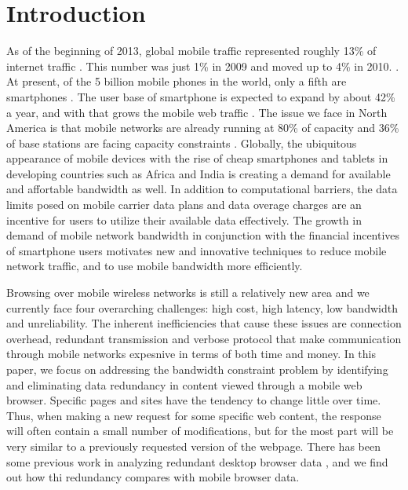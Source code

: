 \section{Introduction}
As of the beginning of 2013, global mobile traffic represented roughly 13\% of internet traffic \cite{?}. This number was just 1\% in 2009 and moved up 
to 4\% in 2010. \cite{?}. At present, of the 5 billion mobile phones in the world, only a fifth are 
smartphones \cite{?}. The user base of smartphone is expected to expand by about 42\% a year, and with that grows the mobile web traffic \cite{?}. The 
issue we face in North America is that mobile networks are already running at 80\% of capacity and 36\% of base stations are facing capacity constraints \cite{?}. Globally, the ubiquitous appearance of mobile devices with the rise of cheap smartphones and 
tablets in developing countries such as Africa and India is creating a demand for available and affortable bandwidth as well. In addition to computational 
barriers, the data limits posed on mobile carrier data plans and data overage charges are an incentive for users to utilize their available data effectively.  The growth in demand of mobile network bandwidth in conjunction with the financial incentives of smartphone users motivates new and innovative techniques 
to reduce mobile network traffic, and to use mobile bandwidth more efficiently. 

Browsing over mobile wireless networks is still a relatively new area and we currently face four overarching challenges: high cost, high latency, low bandwidth and unreliability. The inherent inefficiencies that cause these issues are connection overhead, redundant transmission and verbose protocol that make communication through mobile networks expesnive in terms of both time and money. In this paper, we focus on addressing the bandwidth constraint problem by identifying and eliminating data redundancy in content viewed through a mobile web browser. Specific pages and sites have the tendency 
to change little over time. Thus, when making a new request for some specific web content, the response will often contain a small number of modifications, but for the most part will be very similar to a previously requested version of the webpage. There has been some previous work in analyzing redundant desktop browser data \cite{?}, and we find out how thi redundancy compares with mobile browser data. 


